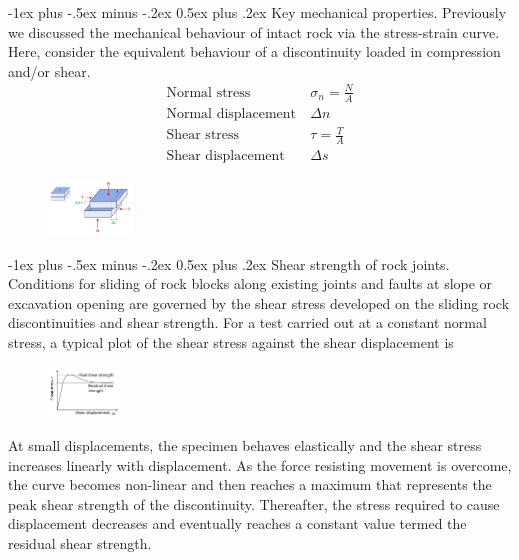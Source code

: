 \documentclass[10pt,landscape,a4paper]{article}
\makeatletter
\renewcommand{\section}{\@startsection{section}{1}{0mm}%
	{-1ex plus -.5ex minus -.2ex}%
	{0.5ex plus .2ex}%
	{\normalfont\large\bfseries}}
\makeatother
\begin{document}
\begin{multicols}{3}
		\section{Key mechanical properties.}
		Previously we discussed the mechanical behaviour of intact rock via the stress-strain curve.
		Here, consider the equivalent behaviour of a discontinuity loaded in compression and/or shear.
		\begin{align*}
			\text{Normal stress}\ & \sigma_n=\frac{N}{A}\\
			\text{Normal displacement}\ & \Delta n\\
			\text{Shear stress}\ & \tau=\frac{T}{A}\\
			\text{Shear displacement}\ & \Delta s
		\end{align*}
		\begin{figure}[H]
			\centering
			\includegraphics[width=0.2\textwidth]{direct-shear-test}
		\end{figure}
		
		\section{Shear strength of rock joints.}
		Conditions for sliding of rock blocks along existing joints and faults at slope or excavation opening are governed by the shear stress developed on the sliding rock discontinuities and shear strength.
		For a test carried out at a constant normal stress, a typical plot of the shear stress against the shear displacement is
		\begin{figure}[H]
			\centering
			\includegraphics[width=0.17\textwidth]{shear-stress-displacement}
		\end{figure}
		At small displacements, the specimen behaves elastically and the shear stress increases linearly with displacement.
		As the force resisting movement is overcome, the curve becomes non-linear and then reaches a maximum that represents the peak shear strength of the discontinuity.
		Thereafter, the stress required to cause displacement decreases and eventually reaches a constant value termed the residual shear strength.
		

\end{multicols}
\end{document}
